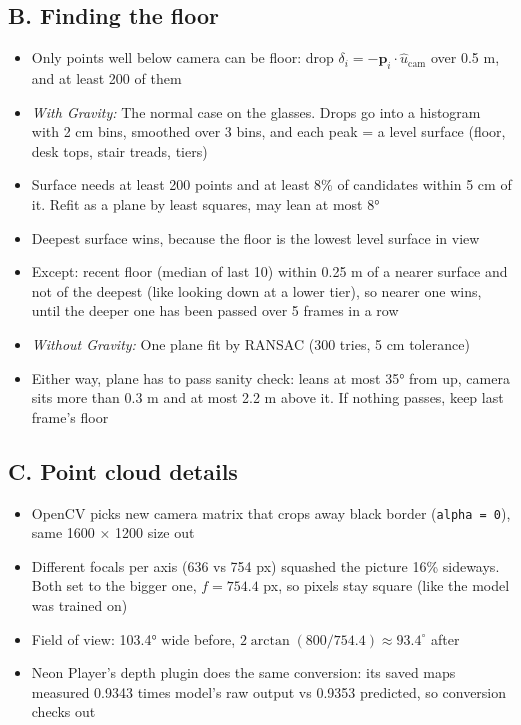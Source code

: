 \documentclass[a4paper]{article}
\begin{document}
\subsection{B. Finding the floor} \label{b-finding-the-floor}
\begin{itemize}
	\item Only points well below camera can be floor: drop $\delta_i = -\mathbf p_i \cdot \hat u_{\text{cam}}$ over 0.5 m, and at least 200 of them
	\item \textit{With Gravity:} The normal case on the glasses. Drops go into a histogram with 2 cm bins, smoothed over 3 bins, and each peak = a level surface (floor, desk tops, stair treads, tiers)  
	\item Surface needs at least 200 points and at least 8\% of candidates within 5 cm of it. Refit as a plane by least squares, may lean at most 8°  
	\item Deepest surface wins, because the floor is the lowest level surface in view  
	\item Except: recent floor (median of last 10) within 0.25 m of a nearer surface and not of the deepest (like looking down at a lower tier), so nearer one wins, until the deeper one has been passed over 5 frames in a row
	\item \textit{Without Gravity:} One plane fit by RANSAC (300 tries, 5 cm tolerance)
	\item Either way, plane has to pass sanity check: leans at most 35° from up, camera sits more than 0.3 m and at most 2.2 m above it. If nothing passes, keep last frame's floor
\end{itemize}

\subsection{C. Point cloud details} \label{c-point-cloud-details}
\begin{itemize}
	\item OpenCV picks new camera matrix that crops away black border (\verb`alpha = 0`), same 1600 × 1200 size out
	\item Different focals per axis (636 vs 754 px) squashed the picture 16\% sideways. Both set to the bigger one, $f = 754.4$ px, so pixels stay square (like the model was trained on)
	\item Field of view: 103.4° wide before, $2 \arctan(800 / 754.4) \approx 93.4^\circ$ after
	\item Neon Player's depth plugin does the same conversion: its saved maps measured 0.9343 times model's raw output vs 0.9353 predicted, so conversion checks out
\end{itemize}
\end{document}
